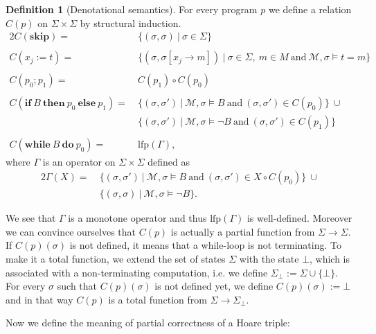 \documentclass[acmsmall]{acmart}
\theoremstyle{plain}
\theoremstyle{definition}
\newtheorem{definition}[theorem]{Definition}
\newcommand{\calM}{\mathcal{M}}
\newcommand{\lfp}{\mathrm{lfp}} %
\newcommand{\hskipit}{\textbf{skip}}
\newcommand{\hif}{\textbf{if}~}
\newcommand{\hthen}{~\textbf{then}~}
\newcommand{\helse}{~\textbf{else}~}
\newcommand{\hwhile}{\textbf{while}~}
\newcommand{\hdo}{~\textbf{do}~}
\begin{document}
\begin{definition}[Denotational semantics]
	For every program $p$ we define a relation $C(p)$ on $\Sigma \times \Sigma$ by structural induction. 
	\begin{alignat*}{2}
		C(\hskipit) =&~ \{(\sigma,\sigma) ~|~ \sigma \in \Sigma \} \\
		\\
		C(x_j := t) =&~ \{(\sigma, \sigma[x_j \rightarrow m]) ~|~ \sigma \in \Sigma,~ m \in M ~\text{and}~ \calM,\sigma \models t = m\} \\ 
		\\
		C(p_0;p_1) =&~ C(p_1) \circ C(p_0) \\
		\\
		C(\hif B \hthen p_0 \helse p_1) =&~\{(\sigma,\sigma') ~|~ \calM,\sigma \models B ~\text{and}~ (\sigma,\sigma') \in C(p_0) \} ~\cup \\
		&~\{(\sigma,\sigma') ~|~ \calM,\sigma \models \neg B~\text{and}~ (\sigma,\sigma') \in C(p_1) \}\\
		\\
		C(\hwhile B \hdo p_0) =&~ \lfp(\Gamma),
	\end{alignat*}
	where $ \Gamma$ is an operator on $\Sigma \times \Sigma$ defined as
	\begin{alignat*}{2}
		\Gamma(X) =~ &\{(\sigma,\sigma') ~|~ \calM,\sigma \models B ~\text{and}~ (\sigma,\sigma') \in X \circ C(p_0)\} ~\cup \\
		&\{(\sigma,\sigma) ~|~ \calM,\sigma \models \neg B\}.
	\end{alignat*}

We see that $\Gamma$ is a monotone operator and thus $\lfp(\Gamma)$ is well-defined.
Moreover we can convince ourselves that $C(p)$ is actually a partial function from $\Sigma \rightarrow \Sigma$. If $C(p)(\sigma)$ is not defined, it means that a while-loop is not terminating. To make it a total function, we extend the set of states $\Sigma$ with the state $\bot$, which is associated with a non-terminating computation, i.e. we define $\Sigma_{\bot} := \Sigma \cup \{\bot\}$. For every $\sigma$ such that $C(p)(\sigma)$ is not defined yet, we define $C(p)(\sigma) := \bot$ and in that way $C(p)$ is a total function from $\Sigma \rightarrow \Sigma_{\bot}$.

\end{definition}

Now we define the meaning of partial correctness of a Hoare triple:
\end{document}
